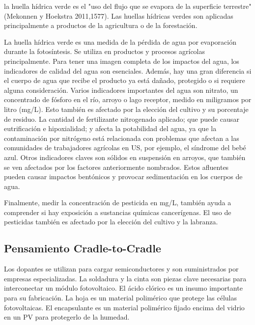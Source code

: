 \documentclass[runningheads]{llncs}
\begin{document}
 
 
 
\bigskip
la huella hídrica verde es el "uso del flujo que se evapora de la superficie terrestre" (Mekonnen y Hoekstra 2011,1577). Las huellas hídricas verdes son aplicadas principalmente a productos de la agricultura o  de la forestación.

\bigskip
La huella hídrica verde es una medida de la pérdida de agua por evaporación durante la fotosíntesis. Se utiliza en productos y procesos agrícolas principalmente. Para tener una imagen completa de los impactos del agua, los indicadores de calidad del agua son esenciales.  Además, hay una gran diferencia si el cuerpo de agua que recibe el producto ya está dañado, protegido o si requiere alguna consideración. Varios indicadores importantes del agua son nitrato, un concentrado de fósforo en el río, arroyo o lago receptor, medido en miligramos por litro (mg/L). Esto también es afectado por la elección del cultivo y su porcentaje de residuo. La cantidad de fertilizante nitrogenado aplicado; que puede causar eutrificación e hipoxialidad; y afecta la potabilidad del agua, ya que la contaminación por nitrógeno está relacionada con problemas que afectan a las comunidades de trabajadores agrícolas en US, por ejemplo, el síndrome del bebé azul. Otros indicadores claves son sólidos en suspensión en arroyos, que también se ven afectados por los factores anteriormente nombrados. Estos afluentes pueden causar impactos bentónicos y provocar sedimentación en los cuerpos de agua.

\bigskip
Finalmente, medir la concentración de pesticida en mg/L, también ayuda a comprender si hay exposición a sustancias químicas cancerígenas. El uso de pesticidas también es afectado por la elección del cultivo y la labranza.
 

\subsection{Pensamiento Cradle-to-Cradle}
 
 \bigskip
Los dopantes se utilizan para cargar semiconductores y son suministrados por empresas especializadas. La soldadura y la cinta son piezas clave necesarias para interconectar un módulo fotovoltaico. El ácido clórico es un insumo importante para su fabricación. La hoja es un material polimérico que protege las células fotovoltaicas. El encapsulante es un material polimérico fijado encima del vidrio en un PV para protegerlo de la humedad.
\end{document}
